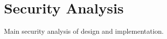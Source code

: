 \section{Security Analysis}%
\label{sec:security_analysis}
Main security analysis of design and implementation.

